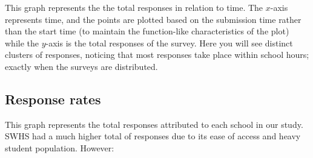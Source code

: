 \documentclass[12pt, letterpaper]{article}
\begin{document}

This graph represents the the total responses in relation to time. The $x$-axis represents time, and the points are plotted based on the submission time rather than the start time (to maintain the function-like characteristics of the plot) while the $y$-axis is the total responses of the survey. Here you will see distinct clusters of responses, noticing that most responses take place within school hours; exactly when the surveys are distributed.

\subsection{Response rates}

\begin{center}
\end{center}

This graph represents the total responses attributed to each school in our study. SWHS had a much higher total of responses due to its ease of access and heavy student population. However:

\begin{center}
\end{center}
\end{document}
